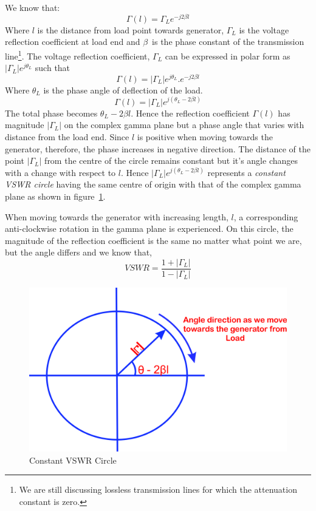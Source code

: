 We know that:
\begin{equation*}
\Gamma(l) =\Gamma_L e^{-j2\beta{l}}
\end{equation*}
Where $l$ is the distance from load point towards generator, $\Gamma_{L}$ is the voltage reflection coefficient at load end and $\beta$\ is the phase constant of the transmission line\footnote{
We are still discussing lossless transmission lines for which the attenuation constant is zero.
}. The  voltage reflection coefficient, $\Gamma_L$ can be expressed in polar form as $|\Gamma_{L}|e^{j\theta_L}$ such that
\begin{equation*}
\Gamma{(l)}=|\Gamma_{L}|e^{j\theta_L}.e^{-j2\beta l}
\end{equation*}
Where $\theta_L$ is the phase angle of deflection of the load.
\begin{equation}
\Gamma{(l)} =|\Gamma_L|e^{j(\theta_L - 2\beta{l})}
\end{equation}
The total phase becomes $\theta_L - 2\beta{l}$. Hence the reflection coefficient $\Gamma{(l)}$ has magnitude $|\Gamma_L|$ on the complex gamma plane but a phase angle that varies with distance from the load end. Since $l$ is positive when moving towards the generator, therefore, the phase increases in negative direction. The distance of the point $|\Gamma_L|$ from the centre of the circle remains constant but it's angle changes with a change with respect to $l$. Hence $|\Gamma_L|e^{j(\theta_L - 2\beta l)}$ represents a \emph{constant VSWR circle} having the same centre of origin with that of the complex gamma plane as shown in figure~\ref{fig:lkjhgryn}.

When moving towards the generator with increasing length, $l$, a corresponding anti-clockwise rotation in the gamma plane is experienced. On this circle, the magnitude of the reflection coefficient is the same no matter what point we are, but the angle differs and we know that,
\begin{equation}
VSWR = \frac{1 + |\Gamma_L|}{1 - |\Gamma_L|}
\end{equation}
\begin{figure}[h]
\centering
\includegraphics[width=0.7\linewidth]{./graphics/lkjhgryn}
\caption{Constant VSWR Circle}
\label{fig:lkjhgryn}
\end{figure}

